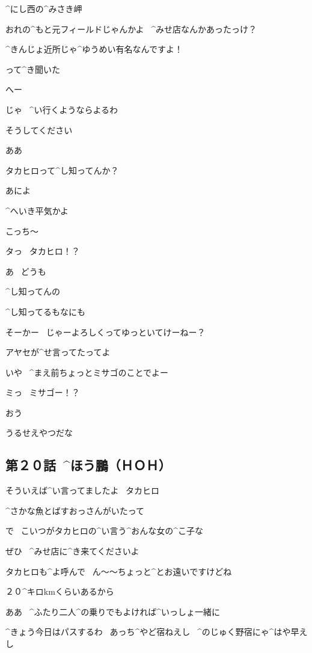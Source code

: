 \page
\Ayase ^{にし}{西}の^{みさき}{岬}

\Ayase おれの^{もと}{元}フィールドじゃんかよ
\ ^{みせ}{店}なんかあったっけ？

\Alpha ^{きんじょ}{近所}じゃ^{ゆうめい}{有名}なんですよ！

\Alpha って^{き}{聞}いた

\Ayase へー

\Ayase じゃ
\ ^{い}{行}くようならよるわ

\Alpha そうしてください

\Ayase ああ

\page
\Ayase タカヒロって^{し}{知}ってんか？

\Ayase あによ

\Ayase ^{へいき}{平気}かよ

\Alpha こっち〜

\page
\Alpha タっ
\ タカヒロ！？

\Alpha あ
\ どうも

\Ayase ^{し}{知}ってんの

\Alpha ^{し}{知}ってるもなにも

\Ayase そーかー
\ じゃーよろしくってゆっといてけーねー？

\page
\Ayase アヤセが^{せ}{言}ってたってよ

\Ayase いや
\ ^{まえ}{前}ちょっとミサゴのことでよー

\Alpha ミっ
\ ミサゴー！？

\Ayase おう

\Ayase うるせえやつだな


\subsection{第２０話\ ^{ほう}{鵬}（ＨＯＨ）}


\page[68]
\Alpha そういえば^{い}{言}ってましたよ
\ タカヒロ

\Alpha ^{さかな}{魚}とばすおっさんがいたって

\Ayase で
\ こいつがタカヒロの^{い}{言}う^{おんな}{女}の^{こ}{子}な

\page
\Alpha ぜひ
\ ^{みせ}{店}に^{き}{来}てくださいよ

\Alpha タカヒロも^{よ}{呼}んで
\ ん〜〜ちょっと^{とお}{遠}いですけどね

\Alpha ２０^{キロ}{km}くらいあるから

\Alpha ああ
\ ^{ふたり}{二人}^{の}{乗}りでもよければ^{いっしょ}{一緒}に

\Ayase ^{きょう}{今日}はパスするわ
\ あっち^{やど}{宿}ねえし
\ ^{のじゅく}{野宿}にゃ^{はや}{早}えし

